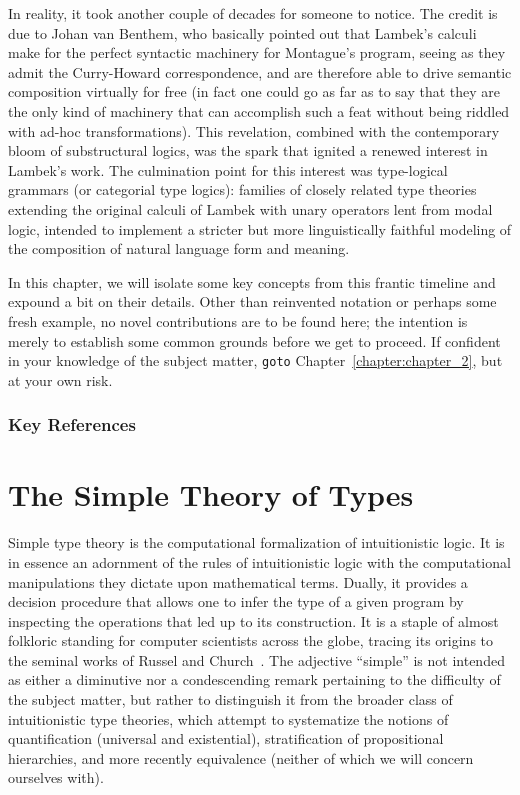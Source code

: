 In reality, it took another couple of decades for someone to notice.
The credit is due to Johan van Benthem, who basically pointed out that Lambek's calculi make for the perfect syntactic machinery for Montague's program, seeing as they admit the Curry-Howard correspondence, and are therefore able to drive semantic composition virtually for free (in fact one could go as far as to say that they are the only kind of machinery that can accomplish such a feat without being riddled with ad-hoc transformations).
This revelation, combined with the contemporary bloom of substructural logics, was the spark that ignited a renewed interest in Lambek's work.
The culmination point for this interest was type-logical grammars (or categorial type logics): families of closely related type theories extending the original calculi of Lambek with unary operators lent from modal logic, intended to implement a stricter but more linguistically faithful modeling of the composition of natural language form and meaning.

In this chapter, we will isolate some key concepts from this frantic timeline and expound a bit on their details.
Other than reinvented notation or perhaps some fresh example, no novel contributions are to be found here; the intention is merely to establish some common grounds before we get to proceed. 
If confident in your knowledge of the subject matter, \texttt{goto} Chapter~\ref{chapter:chapter_2}, but at your own risk.

\subsubsection*{Key References}

\newpage

\section{The Simple Theory of Types}

Simple type theory is the computational formalization of intuitionistic logic. 
It is in essence an adornment of the rules of intuitionistic logic with the computational manipulations they dictate upon mathematical terms.
Dually, it provides a decision procedure that allows one to infer the type of a given program by inspecting the operations that led up to its construction.
It is a staple of almost folkloric standing for computer scientists across the globe, tracing its origins to the seminal works of Russel and Church~\cite{russel1908,church1940}.
The adjective ``simple'' is not intended as either a diminutive nor a condescending remark pertaining to the difficulty of the subject matter, but rather to distinguish it from the broader class of intuitionistic type theories, which attempt to systematize the notions of quantification (universal and existential), stratification of propositional hierarchies, and more recently equivalence (neither of which we will concern ourselves with).

